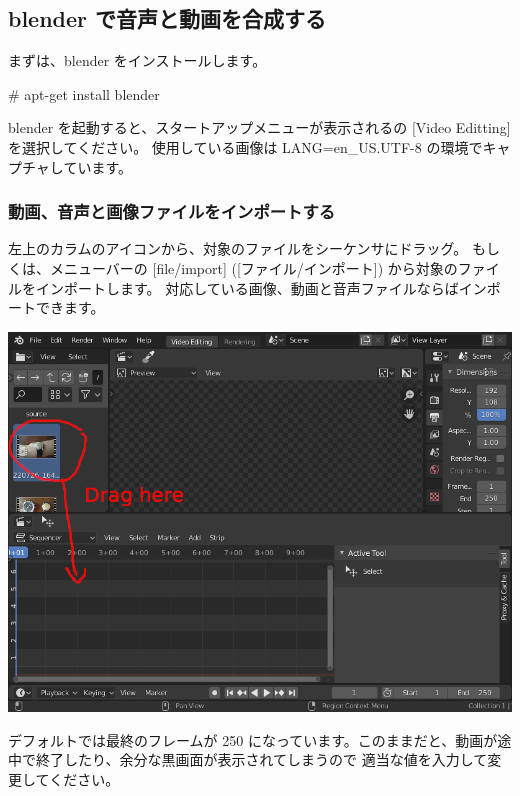 \documentclass[mingoth,a4paper]{jsarticle}
\begin{document}
\subsection{blender で音声と動画を合成する}

まずは、blender をインストールします。
\begin{commandline}
# apt-get install blender
\end{commandline}

blender を起動すると、スタートアップメニューが表示されるの [Video Editting]  を選択してください。
使用している画像は LANG=en\_US.UTF-8 の環境でキャプチャしています。


\subsubsection{動画、音声と画像ファイルをインポートする}

左上のカラムのアイコンから、対象のファイルをシーケンサにドラッグ。
もしくは、メニューバーの [file/import] ([ファイル/インポート]) から対象のファイルをインポートします。
対応している画像、動画と音声ファイルならばインポートできます。


\begin{center}
\includegraphics[scale=0.3]{image202209/blender_import.png}
\end{center}

デフォルトでは最終のフレームが 250 になっています。このままだと、動画が途中で終了したり、余分な黒画面が表示されてしまうので
適当な値を入力して変更してください。
\end{document}
